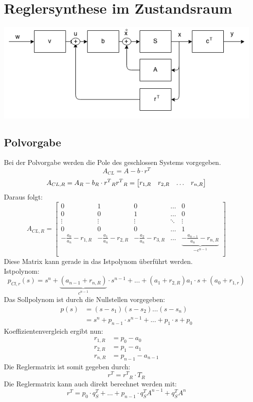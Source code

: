 \section{Reglersynthese im Zustandsraum}
\begin{center}
	\includegraphics[scale = 0.4]{images/zustandsregler.png}
\end{center}
\subsection{Polvorgabe}
Bei der Polvorgabe werden die Pole des geschlossen Systems vorgegeben.
\[
	A_{CL}= A-b\cdot r^T
\]
\[
	A_{CL,R}= A_R-b_R\cdot {r^T}_R	\\	{r^T}_R=
		\begin{bmatrix}
				r_{1,R}	&	r_{2,R}	& \ldots &r_{n,R}\\
		\end{bmatrix}
\]
Daraus folgt:
\[
		A_{CL,R}=
		\begin{bmatrix}
			0 &	1 & 0 & \ldots & 0\\
			0 & 0 & 1 & \ldots & 0\\
			\vdots & \vdots & \vdots & \ddots & \vdots \\
			0 & 0 & 0 & \ldots & 1\\
			-\frac{a_0}{a_n}-r_{1,R}  &-\frac{a_1}{a_n}-r_{2,R} & -\frac{a_2}{a_n}-r_{3,R} & \ldots &\underbrace{-\frac{a_{n-1}}{a_n}-r_{n,R}}_{\textbf{$-c^{n-1}$}}\\	
		\end{bmatrix}
\]
Diese Matrix kann gerade in das Istpolynom überführt werden.
\\
Istpolynom:
\[
	p_{Cl,r}(s)=s^n+
	\underbrace{(a_{n-1}+r_{n,R})	}_{\textbf{$c^{n-1}$}}
	\cdot s^{n-1}+...+(a_{1}+r_{2,R})a_1\cdot s +(a_0+r_{1,r})
\]
Das Sollpolynom ist durch die Nullstellen vorgegeben:
\[\begin{aligned}
	p(s) &= (s-s_1)(s-s_2)\ldots(s-s_n)\\
	&=s^n+p_{n-1}\cdot s^{n-1}+...+p_1\cdot s +p_0
\end{aligned}\]
Koeffizientenvergleich ergibt nun:
\[\begin{aligned}
	r_{1,R}&=p_0-a_0 \\
	r_{2,R}&=p_1-a_1 \\
	r_{n,R}&=p_{n-1}-a_{n-1}
\end{aligned}\]
Die Reglermatrix ist somit gegeben durch:
\[
	r^T={r^T}_R \cdot T_R
\]
Die Reglermatrix kann auch direkt berechnet werden mit:
\[
	r^T = p_0 \cdot q^T_S + \ldots + p_{n-1}\cdot q^T_S A^{n-1} + q^T_S A^n
\]



